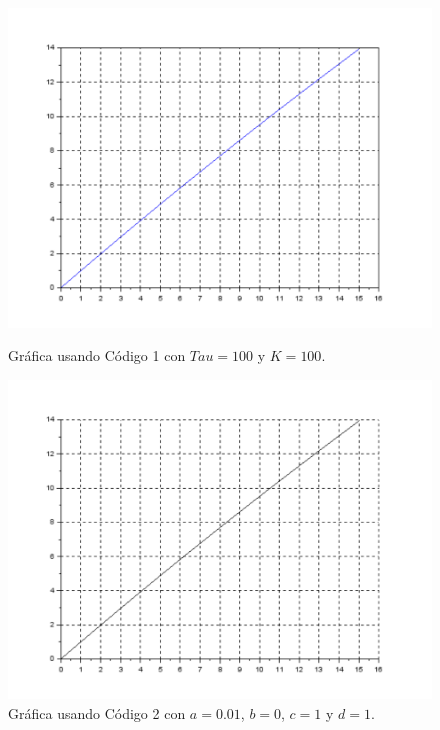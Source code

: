 \documentclass[12pt,a4paper]{article}
\begin{document}
\begin{figure}[h!]
\begin{minipage}{8cm} 
\centering
\includegraphics[scale=0.4]{WiMayorWo_profe.pdf}
\caption{Gráfica usando Código 1 con $Tau = 100$ y $K=100$.}
\label{Figura6}
\end{minipage}
\hspace{0.5cm}
\begin{minipage}{8cm}
\centering
\includegraphics[scale=0.4]{WiMayorWo_yo.pdf}
\caption{Gráfica usando Código 2 con $a = 0.01$, $b = 0$, $c = 1$ y $d = 1$.}
\label{Figura7}
\end{minipage}
\end{figure}
\newpage
\end{document}
